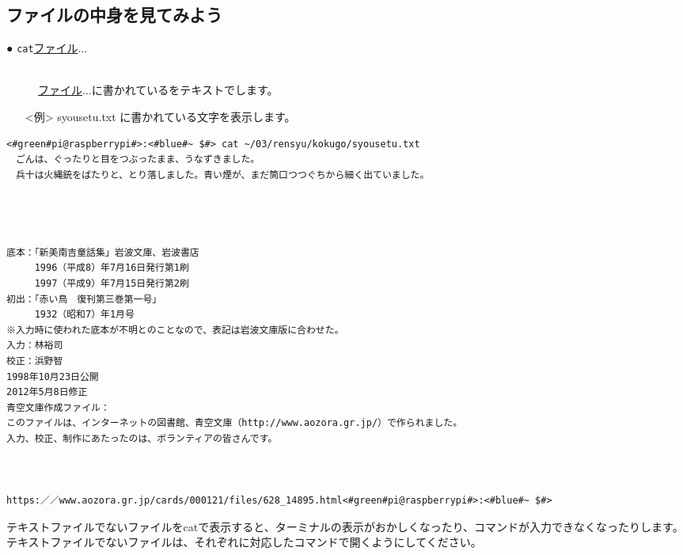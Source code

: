 \subsection{ファイルの中身を見てみよう}
\begin{description}
\item[● \texttt{cat}\textvisiblespace \underline{ファイル}$\ldots$ ]\mbox{}\\
\underline{ファイル}$\ldots$に書かれているをテキストでします。
\end{description}
\begin{itemize}
\item[<例>]syousetu.txt に書かれている文字を表示します。
\end{itemize}
\begin{lstlisting}[caption=catの例, label=cat]
<#green#pi@raspberrypi#>:<#blue#~ $#> cat ~/03/rensyu/kokugo/syousetu.txt
　ごんは、ぐったりと目をつぶったまま、うなずきました。
　兵十は火縄銃をばたりと、とり落しました。青い煙が、まだ筒口つつぐちから細く出ていました。




底本：「新美南吉童話集」岩波文庫、岩波書店
　　　1996（平成8）年7月16日発行第1刷
　　　1997（平成9）年7月15日発行第2刷
初出：「赤い鳥　復刊第三巻第一号」
　　　1932（昭和7）年1月号
※入力時に使われた底本が不明とのことなので、表記は岩波文庫版に合わせた。
入力：林裕司
校正：浜野智
1998年10月23日公開
2012年5月8日修正
青空文庫作成ファイル：
このファイルは、インターネットの図書館、青空文庫（http://www.aozora.gr.jp/）で作られました。
入力、校正、制作にあたったのは、ボランティアの皆さんです。



https:／／www.aozora.gr.jp/cards/000121/files/628_14895.html<#green#pi@raspberrypi#>:<#blue#~ $#>
\end{lstlisting}
テキストファイルでないファイルをcatで表示すると、ターミナルの表示がおかしくなったり、コマンドが入力できなくなったりします。テキストファイルでないファイルは、それぞれに対応したコマンドで開くようにしてください。

